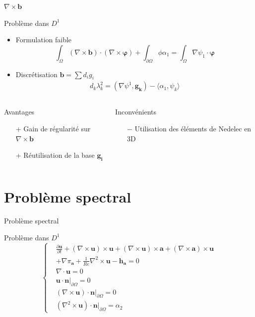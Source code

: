 \documentclass{beamer}
\newcommand{\grad}{{\nabla}}
\newcommand{\rot}{{\nabla\times}}
\newcommand{\rott}{{\nabla^2\times}}
\renewcommand{\div}{{\nabla\cdot}}
\newcommand{\restr}{{\big\rvert_{\partial\Omega}}}
\begin{document}
\begin{frame}{$\rot \mathbf{b}$}
\begin{block}{Problème dans $ D^1$}
\begin{itemize}
\item Formulation faible
\[ \int_\Omega (\rot\mathbf{b})\cdot(\rot\bm{\varphi}) + \int_{\partial\Omega} \phi\alpha_1 = \int_\Omega \grad\psi_1\cdot\bm{\varphi} \]
\item Discrétisation $\mathbf{b}=\sum d_ig_i$
\begin{align*}
d_k\lambda_k^2 = (\grad\psi^1,\mathbf{g_k}) - \langle\alpha_1,\psi_k\rangle
\end{align*}
\end{itemize}
\end{block}
\begin{columns}[t]
\begin{column}{5cm}
\begin{exampleblock}{Avantages}
\begin{itemize}
\item[+] Gain de régularité sur $\rot \mathbf{b}$
\item[+] Réutilisation de la base $\mathbf{g_i}$ 
\end{itemize}
\end{exampleblock}
\end{column}
\begin{column}{5cm}
\begin{alertblock}{Inconvénients}
\begin{itemize}
\item[$-$] Utilisation des éléments de Nedelec en 3D
\end{itemize}
\end{alertblock}
\end{column}
\end{columns}
\end{frame}

\section{Problème spectral}
\begin{frame}{Problème spectral}
\begin{block}{Problème dans $ D^1$}
\[\left\{\begin{aligned}
&\frac{\partial \mathbf{u}}{\partial t} + (\rot \mathbf{u})\times \mathbf{u} + (\rot \mathbf{u})\times \mathbf{a} + \left(\rot \mathbf{a}\right)\times \mathbf{u} \\
&+ \grad\pi_\mathbf{a} + \frac{1}{Re}\rott \mathbf{u} - \mathbf{h_a} = 0\\
&\div \mathbf{u} = 0\\
&\mathbf{u}\cdot \mathbf{n}\restr = 0\\
&(\rot \mathbf{u})\cdot \mathbf{n}\restr = 0\\
&(\rott \mathbf{u})\cdot \mathbf{n}\restr = \alpha_2
\end{aligned}\right.\]
\end{block}
\end{frame}
\end{document}
